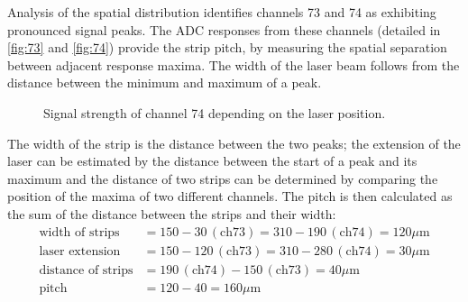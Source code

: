 Analysis of the spatial distribution identifies channels 73 and 74 as exhibiting pronounced signal peaks. The ADC responses from these channels (detailed in \autoref{fig:73} and \autoref{fig:74}) provide the strip pitch, by measuring the spatial separation between adjacent response maxima. The width of the laser beam follows from the distance between the minimum and maximum of a peak.

\begin{figure}[H]
	\centering
	\caption{Signal strength of channel 74 depending on the laser position.}
	\label{fig:74}
\end{figure}

The width of the strip is the distance between the two peaks; the extension of the laser can be estimated by the distance between the start of a peak and its maximum and the distance of two strips can be determined by comparing the position of the maxima
of two different channels. The pitch is then calculated as the sum of the distance between the strips and their width:
\begin{align*}
\text{width of strips} &= 150 - 30 \hspace{2pt}(\text{ch73}) = 310 - 190 \hspace{2pt}(\text{ch74}) = 120 \mu \text{m} \\
\text{laser extension} &= 150 - 120 \hspace{2pt}(\text{ch73}) = 310 - 280 \hspace{2pt}(\text{ch74}) = 30 \mu \text{m} \\
\text{distance of strips} &= 190\hspace{2pt}(\text{ch74}) - 150\hspace{2pt}(\text{ch73}) = 40 \mu \text{m} \\
\text{pitch} &= 120 - 40 = 160 \mu \text{m}
\end{align*}
